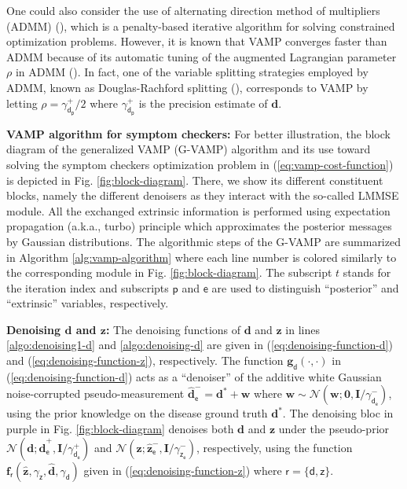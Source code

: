 \documentclass[pmlr,twocolumn,10pt]{jmlr} %
\begin{document}
One could also consider the use of alternating direction method of multipliers (ADMM) (\cite{boyd2011distributed}), which is a penalty-based iterative algorithm for solving constrained optimization problems. However, it is known that VAMP converges faster than ADMM because of its automatic tuning of the augmented Lagrangian parameter $\rho$ in ADMM (\cite{manoel2018approximate}). In fact, one of the variable splitting strategies employed by ADMM, known as Douglas-Rachford splitting (\cite{douglas1956numerical}), corresponds to VAMP by letting $\rho = \gamma_{\bm{\mathsf{d}}_{\mathsf{p}}}^+/2$ where $\gamma_{\bm{\mathsf{d}}_{\mathsf{p}}}^+$ is the precision estimate of $\mathbf{d}$.\vspace{0.1cm}

\noindent \textbf{VAMP algorithm for symptom checkers:}
For better illustration, the block diagram of the generalized VAMP (G-VAMP) algorithm and its use toward solving the symptom checkers optimization problem in (\ref{eq:vamp-cost-function}) is depicted in Fig. \ref{fig:block-diagram}. There, we show its different constituent blocks, namely the different denoisers as they interact with the so-called LMMSE module. All the exchanged extrinsic information is performed using expectation propagation (a.k.a., turbo) principle which approximates the posterior messages by Gaussian distributions. The algorithmic steps of the G-VAMP are summarized in 
Algorithm \ref{alg:vamp-algorithm} where each line number is colored similarly to the corresponding module in Fig. \ref{fig:block-diagram}. The subscript $t$ stands for the iteration index and subscripts $\mathsf{p}$ and $\mathsf{e}$ are used to distinguish “posterior” and “extrinsic” variables, respectively.%


\noindent \textbf{Denoising $\bm{d}$ and $\bm{z}$:} The denoising functions of $\mathbf{d}$ and $\mathbf{z}$ in lines \ref{algo:denoising1-d} and \ref{algo:denoising-d} are given in (\ref{eq:denoising-function-d}) and (\ref{eq:denoising-function-z}), respectively. The function $\bm{g}_{\bm{\mathsf{d}}}\left(\cdot, \cdot\right)$ in (\ref{eq:denoising-function-d}) acts as a “denoiser” of the additive white Gaussian noise-corrupted pseudo-measurement $\mathbf{\widehat{d}}^-_{\mathsf{e}} = \bm{d}^* + \mathbf{w}$ where $\mathbf{w}\sim\mathcal{N}(\bm{w};\bm{0},\bm{I}/\gamma_{\bm{\mathsf{d}}_{\mathsf{e}}}^{-})$, using the prior knowledge on the disease ground truth $\bm{d}^*$. The denoising bloc in purple in Fig. \ref{fig:block-diagram} denoises both $\mathbf{d}$ and $\mathbf{z}$ under the pseudo-prior $\mathcal{N}(\bm{d};\mathbf{\widehat{d}}^+_{\mathsf{e}},\bm{I}/\gamma_{\bm{\mathsf{d}}_{\mathsf{e}}}^+)$ and $\mathcal{N}(\bm{z};\mathbf{\widehat{z}}^-_{\mathsf{e}},\bm{I}/\gamma_{\bm{\mathsf{z}}_{\mathsf{e}}}^-)$, respectively, using the function $\bm{f}_{\bm{\mathsf{r}}}\left(\mathbf{\widehat{z}}, \gamma_{\bm{\mathsf{z}}}, \mathbf{\widehat{d}}, \gamma_{\bm{\mathsf{d}}}\right)$ given in (\ref{eq:denoising-function-z}) where $\bm{\mathsf{r}} = \{\bm{\mathsf{d}}, \bm{\mathsf{z}}\}$.\vspace{0.1cm}
\end{document}
